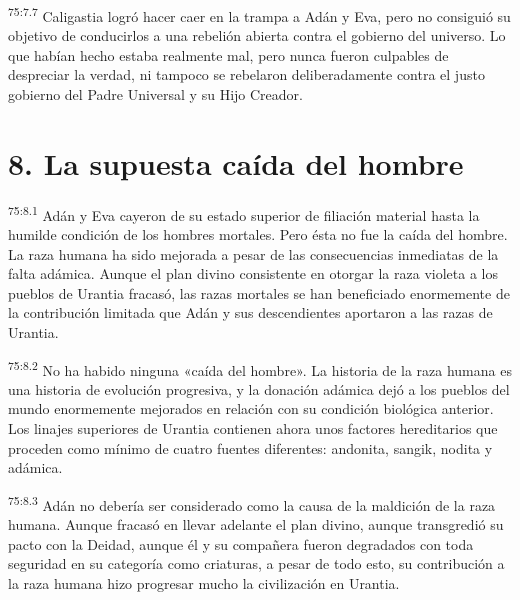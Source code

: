 \par
\textsuperscript{75:7.7} Caligastia logró hacer caer en la trampa a Adán y Eva, pero no consiguió su objetivo de conducirlos a una rebelión abierta contra el gobierno del universo. Lo que habían hecho estaba realmente mal, pero nunca fueron culpables de despreciar la verdad, ni tampoco se rebelaron deliberadamente contra el justo gobierno del Padre Universal y su Hijo Creador.

\section*{8. La supuesta caída del hombre}
\par
\textsuperscript{75:8.1} Adán y Eva cayeron de su estado superior de filiación material hasta la humilde condición de los hombres mortales. Pero ésta no fue la caída del hombre. La raza humana ha sido mejorada a pesar de las consecuencias inmediatas de la falta adámica. Aunque el plan divino consistente en otorgar la raza violeta a los pueblos de Urantia fracasó, las razas mortales se han beneficiado enormemente de la contribución limitada que Adán y sus descendientes aportaron a las razas de Urantia.

\par
\textsuperscript{75:8.2} No ha habido ninguna «caída del hombre». La historia de la raza humana es una historia de evolución progresiva, y la donación adámica dejó a los pueblos del mundo enormemente mejorados en relación con su condición biológica anterior. Los linajes superiores de Urantia contienen ahora unos factores hereditarios que proceden como mínimo de cuatro fuentes diferentes: andonita, sangik, nodita y adámica.

\par
\textsuperscript{75:8.3} Adán no debería ser considerado como la causa de la maldición de la raza humana. Aunque fracasó en llevar adelante el plan divino, aunque transgredió su pacto con la Deidad, aunque él y su compañera fueron degradados con toda seguridad en su categoría como criaturas, a pesar de todo esto, su contribución a la raza humana hizo progresar mucho la civilización en Urantia.

